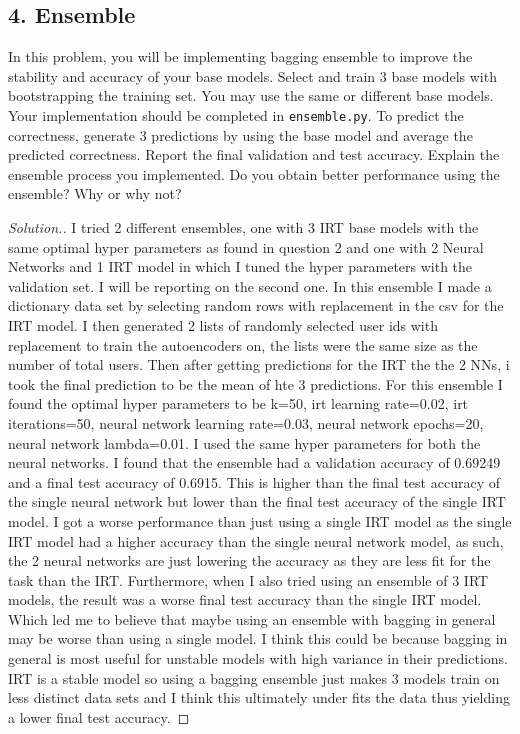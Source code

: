 \documentclass[11pt]{article}
\begin{document}
\subsection*{4. Ensemble} In this problem, you will be implementing bagging ensemble to improve the stability and accuracy of your base models. Select and train 3 base models with bootstrapping the training set. You may use the same or different base models. Your implementation should be completed in \verb|ensemble.py|. To predict the correctness, generate 3 predictions by using the base model and average the predicted correctness. Report the final validation and test accuracy. Explain the ensemble process you implemented. Do you obtain better performance using the ensemble? Why or why not?

\begin{proof}[Solution.]
    I tried 2 different ensembles, one with 3 IRT base models with the same optimal hyper parameters as found in question 2 and one with 2 Neural Networks and 1 IRT model in which I tuned the hyper parameters with the validation set. I will be reporting on the second one. In this ensemble I made a dictionary data set by selecting random rows with replacement in the csv for the IRT model. I then generated 2 lists of randomly selected user ids with replacement to train the autoencoders on, the lists were the same size as the number of total users. Then after getting predictions for the IRT the the 2 NNs, i took the final prediction to be the mean of hte 3 predictions. For this ensemble I found the optimal hyper parameters to be k=50, irt learning rate=0.02, irt iterations=50, neural network learning rate=0.03, neural network epochs=20, neural network lambda=0.01. I used the same hyper parameters for both the neural networks. I found that the ensemble had a validation accuracy of 0.69249 and a final test accuracy of 0.6915. This is higher than the final test accuracy of the single neural network but lower than the final test accuracy of the single IRT model. I got a worse performance than just using a single IRT model as the single IRT model had a higher accuracy than the single neural network model, as such, the 2 neural networks are just lowering the accuracy as they are less fit for the task than the IRT. Furthermore, when I also tried using an ensemble of 3 IRT models, the result was a worse final test accuracy than the single IRT model. Which led me to believe that maybe using an ensemble with bagging in general may be worse than using a single model. I think this could be because bagging in general is most useful for unstable models with high variance in their predictions. IRT is a stable model so using a bagging ensemble just makes 3 models train on less distinct data sets and I think this ultimately under fits the data thus yielding a lower final test accuracy.
\end{proof}
\end{document}
